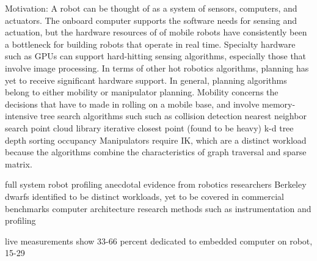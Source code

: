 Motivation:
A robot can be thought of as a system of sensors, computers, and actuators. The onboard computer supports the software needs for sensing and actuation, but the hardware resources of of mobile robots have consistently been a bottleneck for building robots that operate in real time. Specialty hardware such as GPUs can support hard-hitting sensing algorithms, especially those that involve image processing. In terms of other hot robotics algorithms, planning has yet to receive significant hardware support. In general, planning algorithms belong to either mobility or manipulator planning. Mobility concerns the decisions that have to made in rolling on a mobile base, and involve memory-intensive tree search algorithms such such as
 		collision detection	
			nearest neighbor search
			point cloud library
			iterative closest point (found to be heavy)
			k-d tree
		depth sorting
		occupancy
Manipulators require IK, which are a distinct workload because the algorithms combine the characteristics of graph traversal and sparse matrix.

full system robot profiling
anecdotal evidence from robotics researchers
Berkeley dwarfs identified to be distinct workloads, yet to be covered in commercial benchmarks
computer architecture research methods such as instrumentation and profiling

live measurements show 33-66 percent dedicated to embedded computer on robot,
15-29 %
